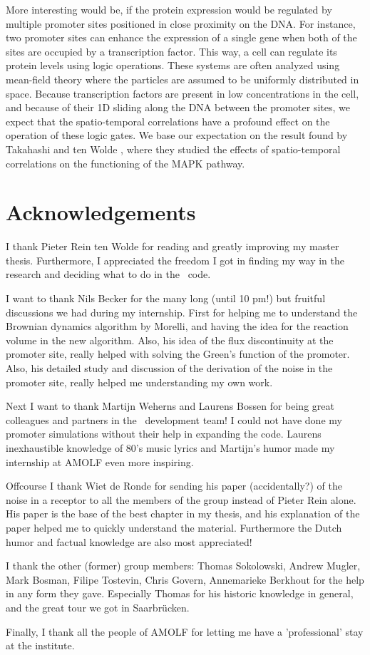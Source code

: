 More interesting would be, if the protein expression would be regulated by multiple promoter sites positioned in close proximity on the DNA. For instance, two promoter sites can enhance the expression of a single gene when both of the sites are occupied by a transcription factor. This way, a cell can regulate its protein levels using logic operations. These systems are often analyzed using mean-field theory where the particles are assumed to be uniformly distributed in space. Because transcription factors are present in low concentrations in the cell, and because of their 1D sliding along the DNA between the promoter sites, we expect that the spatio-temporal correlations have a profound effect on the operation of these logic gates. We base our expectation on the result found by Takahashi and ten Wolde \cite{Takahashi2010}, where they studied the effects of spatio-temporal correlations on the functioning of the MAPK pathway.

\newpage

\section{Acknowledgements}
I thank Pieter Rein ten Wolde for reading and greatly improving my master thesis. Furthermore, I appreciated the freedom I got in finding my way in the research and deciding what to do in the \GFRD\, code.

I want to thank Nils Becker for the many long (until 10 pm!) but fruitful discussions we had during my internship. First for helping me to understand the Brownian dynamics algorithm by Morelli, and having the idea for the reaction volume in the new algorithm. Also, his idea of the flux discontinuity at the promoter site, really helped with solving the Green's function of the promoter. Also, his detailed study and discussion of the derivation of the noise in the promoter site, really helped me understanding my own work. 

Next I want to thank Martijn Weherns and Laurens Bossen for being great colleagues and partners in the \GFRD\, development team! I could not have done my promoter simulations without their help in expanding the code. Laurens inexhaustible knowledge of 80's music lyrics and Martijn's humor made my internship at AMOLF even more inspiring. 

Offcourse I thank Wiet de Ronde for sending his paper (accidentally?) of the noise in a receptor to all the members of the group instead of Pieter Rein alone. His paper is the base of the best chapter in my thesis, and his explanation of the paper helped me to quickly understand the material. Furthermore the Dutch humor and factual knowledge are also most appreciated!

I thank the other (former) group members: Thomas Sokolowski, Andrew Mugler, Mark Bosman, Filipe Tostevin, Chris Govern, Annemarieke Berkhout for the help in any form they gave. Especially Thomas for his historic knowledge in general, and the great tour we got in Saarbr\"ucken.

Finally, I thank all the people of AMOLF for letting me have a 'professional' stay at the institute.
